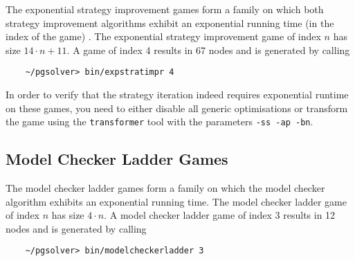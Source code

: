 The exponential strategy improvement games form a family on which both strategy improvement algorithms
exhibit an exponential running time (in the index of the game) \cite{FriedmannSI09}.
The exponential strategy improvement game of index $n$ has size $14 \cdot n + 11$. 
A game of index 4 results in 67 nodes and is generated by calling
\begin{verbatim}
    ~/pgsolver> bin/expstratimpr 4
\end{verbatim}

In order to verify that the strategy iteration indeed requires exponential runtime on these games, you
need to either disable all generic optimisations or transform the game using the \texttt{transformer}
tool with the parameters \texttt{-ss -ap -bn}.





\subsection{Model Checker Ladder Games}

The model checker ladder games form a family on which the model checker algorithm exhibits an
exponential running time.  The model checker ladder game of index $n$ has size $4 \cdot n$. 
A model checker ladder game of index 3 results in 12 nodes and is generated by calling
\begin{verbatim}
    ~/pgsolver> bin/modelcheckerladder 3
\end{verbatim}



